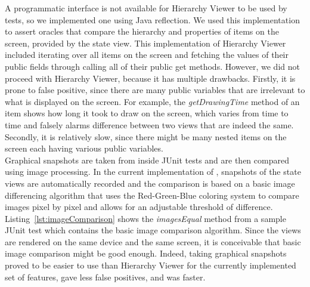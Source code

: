 A programmatic interface is not available for Hierarchy Viewer to be used by tests, so we implemented one using Java reflection. We used this implementation to assert oracles that compare the hierarchy and properties of items on the screen, provided by the state view.
This implementation of Hierarchy Viewer included iterating over all items on the screen and fetching the values of their public fields through calling all of their public get methods. However, we did not proceed with Hierarchy Viewer, because it has multiple drawbacks. Firstly, it is prone to false positive, since there are many public variables that are irrelevant to what is displayed on the screen. For example, the  \emph{getDrawingTime} method of an item shows how long it took to draw on the screen, which varies from time to time and falsely alarms difference between two views that are indeed the same. Secondly, it is relatively slow, since there might be many nested items on the screen each having various public variables.
\\
\indent
Graphical snapshots are taken from inside JUnit tests and are then compared using image processing. In the current implementation of \tool{}, snapshots of the state views are automatically recorded and the comparison is based on a basic image differencing algorithm that uses the Red-Green-Blue coloring system to compare images pixel by pixel and allows for an adjustable threshold of difference.
Listing~\ref{lst:imageComparison} shows the \emph{imagesEqual} method from a sample JUnit test which contains the basic image comparison algorithm.
Since the views are rendered on the same device and the same screen, it is conceivable that basic image comparison might be good enough. Indeed, taking graphical snapshots proved to be easier to use than Hierarchy Viewer for the currently implemented set of features, gave less false positives, and was faster.
\\
%


